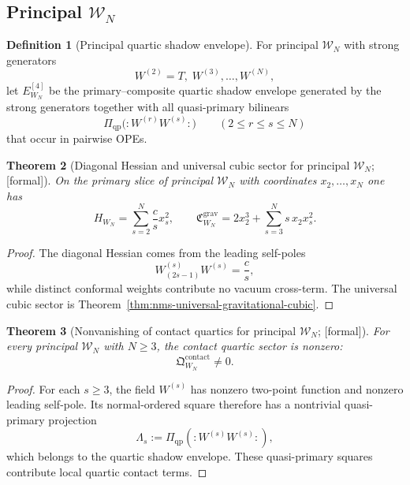\documentclass[11pt,oneside]{memoir}
\numberwithin{equation}{chapter}
\newtheorem{theorem}{Theorem}[chapter]
\theoremstyle{definition}
\newtheorem{definition}[theorem]{Definition}
\newcommand{\ClaimStatusProvedHere}{\textnormal{[formal]}}
\begin{document}
\subsection{Principal \texorpdfstring{$\mathcal W_N$}{WN}}
\label{subsec:nms-principal-wn}

\begin{definition}[Principal quartic shadow envelope]
\label{def:nms-principal-wn-envelope}
For principal $\mathcal W_N$ with strong generators
\[
W^{(2)}=T,\;W^{(3)},\dots,W^{(N)},
\]
let $E_{W_N}^{[4]}$ be the primary--composite quartic shadow envelope generated by the strong generators together with all quasi-primary bilinears
\[
\Pi_{\mathrm{qp}}\bigl(:W^{(r)}W^{(s)}:\bigr)
\qquad (2\le r\le s\le N)
\]
that occur in pairwise OPEs.
\end{definition}

\begin{theorem}[Diagonal Hessian and universal cubic sector for principal \texorpdfstring{$\mathcal W_N$}{WN}; \ClaimStatusProvedHere]
\label{thm:nms-principal-wn-hessian-cubic}
On the primary slice of principal $\mathcal W_N$ with coordinates $x_2,\dots,x_N$ one has
\[
H_{W_N}=\sum_{s=2}^N\frac{c}{s}x_s^2,
\qquad
\mathfrak C^{\mathrm{grav}}_{W_N}=2x_2^3+\sum_{s=3}^N s\,x_2x_s^2.
\]
\end{theorem}

\begin{proof}
The diagonal Hessian comes from the leading self-poles
\[
W^{(s)}_{(2s-1)}W^{(s)}=\frac cs,
\]
while distinct conformal weights contribute no vacuum cross-term.  The universal cubic sector is Theorem~\ref{thm:nms-universal-gravitational-cubic}.\qedhere
\end{proof}

\begin{theorem}[Nonvanishing of contact quartics for principal \texorpdfstring{$\mathcal W_N$}{WN}; \ClaimStatusProvedHere]
\label{thm:nms-principal-wn-contact-nonvanishing}
For every principal $\mathcal W_N$ with $N\ge 3$, the contact quartic sector is nonzero:
\[
\mathfrak Q_{W_N}^{\mathrm{contact}}\neq 0.
\]
\end{theorem}

\begin{proof}
For each $s\ge 3$, the field $W^{(s)}$ has nonzero two-point function and nonzero leading self-pole.  Its normal-ordered square therefore has a nontrivial quasi-primary projection
\[
\Lambda_s:=\Pi_{\mathrm{qp}}(:W^{(s)}W^{(s)}:),
\]
which belongs to the quartic shadow envelope.  These quasi-primary squares contribute local quartic contact terms.\qedhere
\end{proof}
\end{document}
